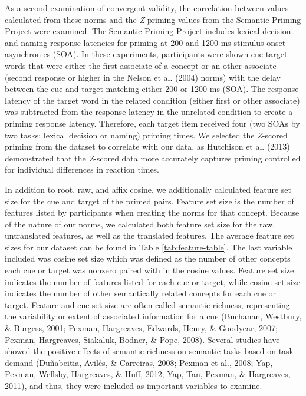 \documentclass[english,,man]{apa6}
\theoremstyle{definition}
\theoremstyle{definition}
\theoremstyle{definition}
\theoremstyle{remark}
\begin{document}
As a second examination of convergent validity, the correlation between
values calculated from these norms and the \emph{Z}-priming values from
the Semantic Priming Project were examined. The Semantic Priming Project
includes lexical decision and naming response latencies for priming at
200 and 1200 ms stimulus onset asynchronies (SOA). In these experiments,
participants were shown cue-target words that were either the first
associate of a concept or an other associate (second response or higher
in the Nelson et al. (2004) norms) with the delay between the cue and
target matching either 200 or 1200 ms (SOA). The response latency of the
target word in the related condition (either first or other associate)
was subtracted from the response latency in the unrelated condition to
create a priming response latency. Therefore, each target item received
four (two SOAs by two tasks: lexical decision or naming) priming times.
We selected the \emph{Z}-scored priming from the dataset to correlate
with our data, as Hutchison et al. (2013) demonstrated that the
\emph{Z}-scored data more accurately captures priming controlled for
individual differences in reaction times.

In addition to root, raw, and affix cosine, we additionally calculated
feature set size for the cue and target of the primed pairs. Feature set
size is the number of features listed by participants when creating the
norms for that concept. Because of the nature of our norms, we
calculated both feature set size for the raw, untranslated features, as
well as the translated features. The average feature set sizes for our
dataset can be found in Table \ref{tab:feature-table}. The last variable
included was cosine set size which was defined as the number of other
concepts each cue or target was nonzero paired with in the cosine
values. Feature set size indicates the number of features listed for
each cue or target, while cosine set size indicates the number of other
semantically related concepts for each cue or target. Feature and cue
set size are often called semantic richness, representing the
variability or extent of associated information for a cue (Buchanan,
Westbury, \& Burgess, 2001; Pexman, Hargreaves, Edwards, Henry, \&
Goodyear, 2007; Pexman, Hargreaves, Siakaluk, Bodner, \& Pope, 2008).
Several studies have showed the positive effects of semantic richness on
semantic tasks based on task demand (Duñabeitia, Avilés, \& Carreiras,
2008; Pexman et al., 2008; Yap, Pexman, Wellsby, Hargreaves, \& Huff,
2012; Yap, Tan, Pexman, \& Hargreaves, 2011), and thus, they were
included as important variables to examine.
\end{document}
